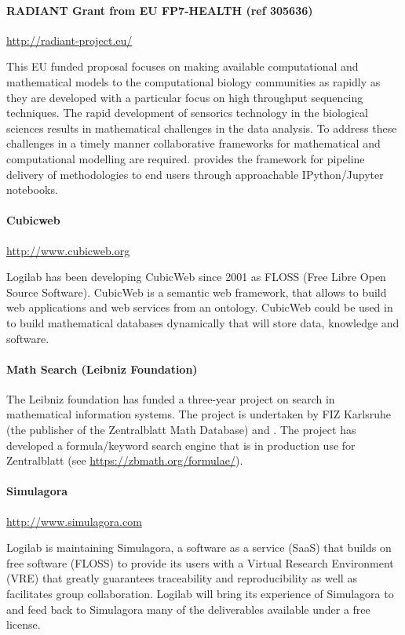 \paragraph{RADIANT Grant from EU FP7-HEALTH (ref 305636)}
\url{http://radiant-project.eu/}

This EU funded proposal focuses on making available computational and
mathematical models to the computational biology communities as
rapidly as they are developed with a particular focus on high
throughput sequencing techniques. The rapid development of sensorics
technology in the biological sciences results in mathematical
challenges in the data analysis. To address these challenges in a
timely manner collaborative frameworks for mathematical and
computational modelling are required. \TheProject provides the
framework for pipeline delivery of methodologies to end users through
approachable IPython/Jupyter notebooks.


\paragraph{Cubicweb} \url{http://www.cubicweb.org}

Logilab has been developing CubicWeb since 2001 as FLOSS (Free Libre Open
Source Software). CubicWeb is a semantic web framework, that allows to
build web applications and web services from an ontology. CubicWeb
could be used in \TheProject to build mathematical databases dynamically
that will store data, knowledge and software.

\paragraph{Math Search (Leibniz Foundation)} The Leibniz foundation has funded a
three-year project on search in mathematical information systems. The project is
undertaken by FIZ Karlsruhe (the publisher of the Zentralblatt Math Database) and
. The project has developed a formula/keyword search engine that is in production
use for Zentralblatt (see \url{https://zbmath.org/formulae/}).

\paragraph{Simulagora} \url{http://www.simulagora.com}

Logilab is maintaining Simulagora, a software as a service (SaaS) that builds
on free software (FLOSS) to provide its users with a Virtual Research Environment
(VRE) that greatly guarantees traceability and reproducibility as well as
facilitates group collaboration. Logilab will bring its experience of Simulagora
to \TheProject and feed back to Simulagora many of the deliverables available
under a free license.

